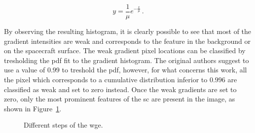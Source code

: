 \begin{equation*}
  y = \frac{1}{\mu} e^{-\frac{x}{\mu}} \,.
\end{equation*}

By observing the resulting histogram, it is clearly possible to see that most of the gradient intensities are weak and corresponds to the feature in the background or on the spacecraft surface. The weak gradient pixel locations can be classified by tresholding the \acrshort{pdf} fit to the gradient histogram. The original authors suggest to use a value of $0.99$ to treshold the \acrshort{pdf}, however, for what concerns this work, all the pixel which corresponds to a cumulative distribution inferior to $0.996$ are classified as weak and set to zero instead. Once the weak gradients are set to zero, only the most prominent features of the \acrshort{sc} are present in the image, as shown in Figure~\ref{fig:wgeSteps}.

\begin{figure}[htbp]
  \centering
  \qquad
  \qquad
  \qquad
  \caption{Different steps of the \acrshort{wge}.}
  \label{fig:wgeSteps}
\end{figure}

